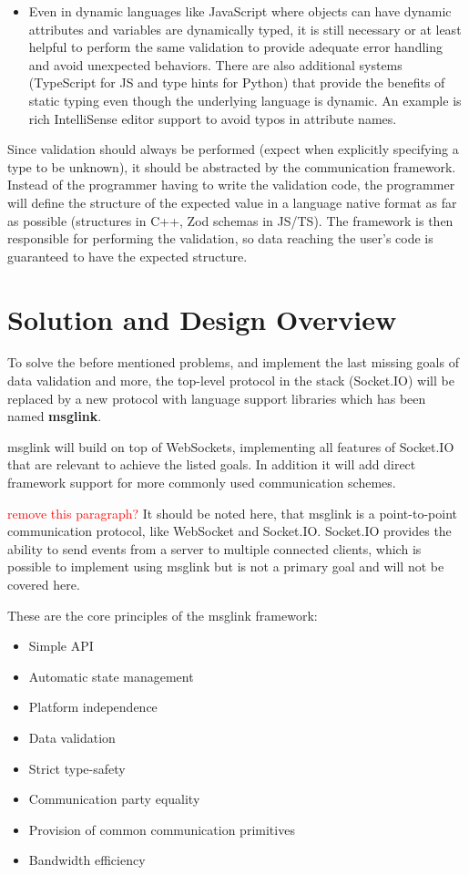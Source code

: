 \documentclass[conference]{IEEEtran}
\begin{document}
\begin{enumerate}
\begin{itemize}
        \item Even in dynamic languages like JavaScript where objects can have dynamic attributes and variables are dynamically typed, it is still necessary or at least helpful to perform the same validation to provide adequate error handling and avoid unexpected behaviors. There are also additional systems (TypeScript for JS and type hints for Python) that provide the benefits of static typing even though the underlying language is dynamic. An example is rich IntelliSense editor support to avoid typos in attribute names.
    \end{itemize}
    Since validation should always be performed (expect when explicitly specifying a type to be unknown), it should be abstracted by the communication framework. Instead of the programmer having to write the validation code, the programmer will define the structure of the expected value in a language native format as far as possible (structures in C++, Zod schemas in JS/TS). The framework is then responsible for performing the validation, so data reaching the user's code is guaranteed to have the expected structure. \cite{b2}
\end{enumerate}


\section{Solution and Design Overview}

To solve the before mentioned problems, and implement the last missing goals of data validation and more, the top-level protocol in the stack (Socket.IO) will be replaced by a new protocol with language support libraries which has been named \textbf{msglink}.

msglink will build on top of WebSockets, implementing all features of Socket.IO that are relevant to achieve the listed goals. In addition it will add direct framework support for more commonly used communication schemes.

\textcolor{red}{remove this paragraph?}
It should be noted here, that msglink is a point-to-point communication protocol, like WebSocket and Socket.IO. Socket.IO provides the ability to send events from a server to multiple connected clients, which is possible to implement using msglink but is not a primary goal and will not be covered here.

These are the core principles of the msglink framework:

\begin{itemize}
    \item Simple API
    \item Automatic state management
    \item Platform independence
    \item Data validation
    \item Strict type-safety
    \item Communication party equality
    \item Provision of common communication primitives
    \item Bandwidth efficiency
\end{itemize}
\end{document}
